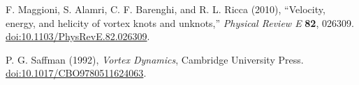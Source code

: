 F. Maggioni, S. Alamri, C. F. Barenghi, and R. L. Ricca (2010),
``Velocity, energy, and helicity of vortex knots and unknots,''
\emph{Physical Review E} \textbf{82}, 026309.
\href{https://doi.org/10.1103/PhysRevE.82.026309}{doi:10.1103/PhysRevE.82.026309}.

P. G. Saffman (1992),
\emph{Vortex Dynamics}, Cambridge University Press.
\href{https://doi.org/10.1017/CBO9780511624063}{doi:10.1017/CBO9780511624063}.
